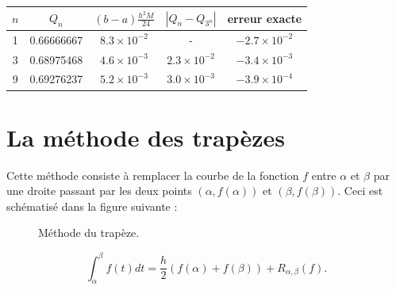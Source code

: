 \begin{table}[H]
	\centering
	\begin{tabular}{ccccc}
		\(n\) & \(Q_n\) & \((b-a)\frac{h^2M}{24}\) & \(|Q_n - Q_{3^n}|\) & erreur exacte \\
		\hline
		1 & 0.66666667 & \(8.3\times10^{-2}\) & - & \(-2.7\times10^{-2}\) \\
		3 & 0.68975468 & \(4.6\times10^{-3}\) & \(2.3\times10^{-2}\) & \(-3.4\times10^{-3}\) \\
		9 & 0.69276237 & \(5.2\times10^{-3}\) & \(3.0\times10^{-3}\) & \(-3.9\times10^{-4}\) \\
	\end{tabular}
\end{table}

\section{La méthode des trapèzes}
Cette méthode consiste à remplacer la courbe de la fonction \( f \) entre \( \alpha \) et \( \beta \) par une droite passant par les deux points \( (\alpha, f(\alpha)) \) et \( (\beta, f(\beta)) \). Ceci est schématisé dans la figure suivante :

\begin{figure}[H]
	\centering
	\caption{Méthode du trapèze.}
\end{figure}

\[
\displaystyle\int_{\alpha}^{\beta} f(t)dt = \frac{h}{2}(f(\alpha) + f(\beta)) + R_{\alpha, \beta}(f).
\]

